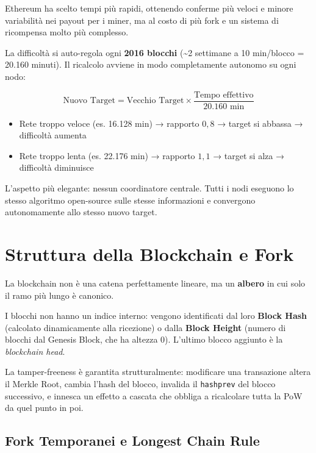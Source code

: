 \documentclass[
  italian,
  openany]{book}
\providecommand{\tightlist}{%
  \setlength{\itemsep}{0pt}\setlength{\parskip}{0pt}}
\begin{document}
Ethereum ha scelto tempi più rapidi, ottenendo conferme più veloci e
minore variabilità nei payout per i miner, ma al costo di più fork e un
sistema di ricompensa molto più complesso.

La difficoltà si auto-regola ogni \textbf{2016 blocchi}
(\textasciitilde2 settimane a 10 min/blocco = 20.160 minuti). Il
ricalcolo avviene in modo completamente autonomo su ogni nodo:

\[\text{Nuovo Target} = \text{Vecchio Target} \times \frac{\text{Tempo effettivo}}{20.160 \text{ min}}\]

\begin{itemize}
\tightlist
\item
  Rete troppo veloce (es. 16.128 min) → rapporto \(0{,}8\) → target si
  abbassa → difficoltà aumenta
\item
  Rete troppo lenta (es. 22.176 min) → rapporto \(1{,}1\) → target si
  alza → difficoltà diminuisce
\end{itemize}

L'aspetto più elegante: nessun coordinatore centrale. Tutti i nodi
eseguono lo stesso algoritmo open-source sulle stesse informazioni e
convergono autonomamente allo stesso nuovo target.

\section{Struttura della Blockchain e
Fork}\label{struttura-della-blockchain-e-fork}

La blockchain non è una catena perfettamente lineare, ma un
\textbf{albero} in cui solo il ramo più lungo è canonico.

I blocchi non hanno un indice interno: vengono identificati dal loro
\textbf{Block Hash} (calcolato dinamicamente alla ricezione) o dalla
\textbf{Block Height} (numero di blocchi dal Genesis Block, che ha
altezza 0). L'ultimo blocco aggiunto è la \emph{blockchain head}.

La tamper-freeness è garantita strutturalmente: modificare una
transazione altera il Merkle Root, cambia l'hash del blocco, invalida il
\texttt{hashprev} del blocco successivo, e innesca un effetto a cascata
che obbliga a ricalcolare tutta la PoW da quel punto in poi.

\subsection{Fork Temporanei e Longest Chain
Rule}\label{fork-temporanei-e-longest-chain-rule}
\end{document}
